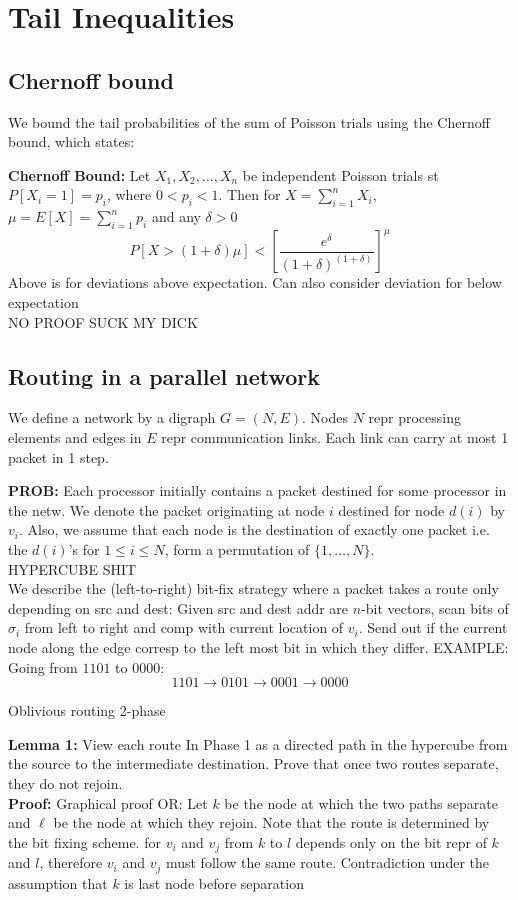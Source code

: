 \documentclass[a4paper]{article}
\begin{document}
\section{Tail Inequalities}
\subsection{Chernoff bound}
We bound the tail probabilities of the sum of Poisson trials using the Chernoff bound, which states:

\textbf{Chernoff Bound:} Let $X_1,X_2,\ldots,X_n$ be independent Poisson trials st $P[X_i=1]=p_i$, where $0<p_i<1$. Then for $X=\sum^{n}_{i=1} X_i$, $\mu=E[X]=\sum^{n}_{i=1} p_i$ and any $\delta > 0$
$$
P[X>(1+\delta)\mu] < \left[ \frac{e^{\delta}}{(1+\delta)^{(1+\delta)}} \right]^{\mu}
$$
Above is for deviations above expectation. Can also consider deviation for below expectation\\
NO PROOF SUCK MY DICK
\subsection{Routing in a parallel network}
We define a network by a digraph $G=(N,E)$. Nodes $N$ repr processing elements and edges in $E$ repr communication links. Each link can carry at most 1 packet in 1 step.

\textbf{PROB: } Each processor initially contains a packet destined for some processor in the netw. We denote the packet originating at node $i$ destined for node $d(i)$ by $v_i$. Also, we assume that each node is the destination of exactly one packet i.e. the $d(i)$'s for $1\leq i \leq N$, form a permutation of $\{1,\ldots, N\}$.\\

HYPERCUBE SHIT\\

We describe the (left-to-right) bit-fix strategy where a packet takes a route only depending on src and dest: Given src and dest addr are $n$-bit vectors, scan bits of $\sigma_i$ from left to right and comp with current location of $v_i$. Send out if the current node along the edge corresp to the left most bit in which they differ. EXAMPLE: Going from $1101$ to $0000$:
$$
  1101\rightarrow 0101 \rightarrow 0001 \rightarrow 0000
$$

Oblivious routing
  2-phase

\textbf{Lemma 1:} View each route In Phase 1 as a directed path in the hypercube from
the source to the intermediate destination. Prove that once two routes separate, they
do not rejoin.\\
\textbf{Proof:} Graphical proof OR: Let $k$ be the node at which the two paths separate and $\ell$ be the node at which they rejoin. Note that the route is determined by the bit fixing scheme. for $v_i$ and $v_j$ from $k$ to $l$ depends only on the bit repr of $k$ and $l$, therefore $v_i$ and $v_j$ must follow the same route. Contradiction under the assumption that $k$ is last node before separation
\end{document}
